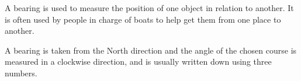 A bearing is used to measure the position of one object in relation to another.  
It is often used by people in charge of boats to help get them from one place to another.

\par
A bearing is taken from the North direction and the angle of the chosen course is 
measured in a clockwise direction, and is usually written down using three numbers.